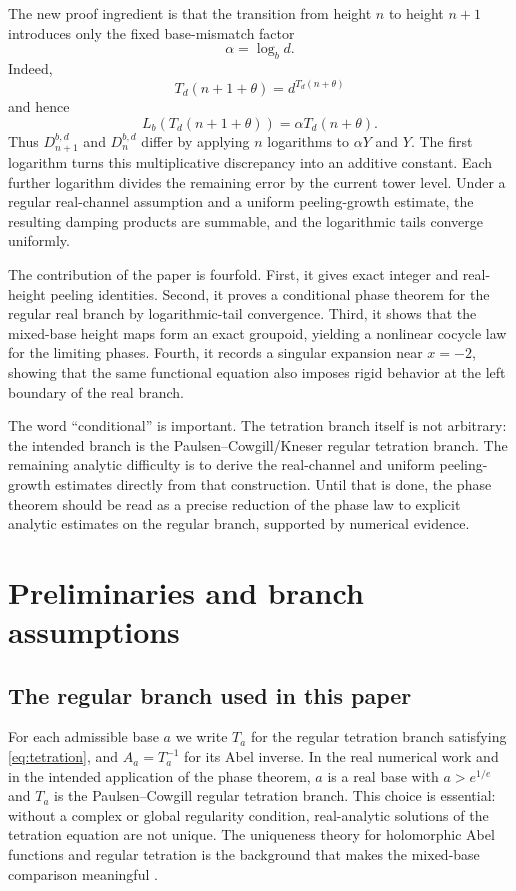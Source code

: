 \documentclass[11pt,a4paper]{article}
\theoremstyle{plain}
\theoremstyle{definition}
\theoremstyle{remark}
\begin{document}
The new proof ingredient is that the transition from height $n$ to height $n+1$ introduces only the fixed base-mismatch factor
\begin{equation}\label{eq:alpha-intro}
  \alpha=\log_b d.
\end{equation}
Indeed,
\[
  T_d(n+1+\theta)=d^{T_d(n+\theta)}
\]
and hence
\[
  L_b(T_d(n+1+\theta))=\alpha T_d(n+\theta).
\]
Thus $D_{n+1}^{b,d}$ and $D_n^{b,d}$ differ by applying $n$ logarithms to $\alpha Y$ and $Y$.  The first logarithm turns this multiplicative discrepancy into an additive constant.  Each further logarithm divides the remaining error by the current tower level.  Under a regular real-channel assumption and a uniform peeling-growth estimate, the resulting damping products are summable, and the logarithmic tails converge uniformly.

The contribution of the paper is fourfold.  First, it gives exact integer and real-height peeling identities.  Second, it proves a conditional phase theorem for the regular real branch by logarithmic-tail convergence.  Third, it shows that the mixed-base height maps form an exact groupoid, yielding a nonlinear cocycle law for the limiting phases.  Fourth, it records a singular expansion near $x=-2$, showing that the same functional equation also imposes rigid behavior at the left boundary of the real branch.

The word ``conditional'' is important.  The tetration branch itself is not arbitrary: the intended branch is the Paulsen--Cowgill/Kneser regular tetration branch.  The remaining analytic difficulty is to derive the real-channel and uniform peeling-growth estimates directly from that construction.  Until that is done, the phase theorem should be read as a precise reduction of the phase law to explicit analytic estimates on the regular branch, supported by numerical evidence.

\section{Preliminaries and branch assumptions}


\subsection{The regular branch used in this paper}

For each admissible base $a$ we write $T_a$ for the regular tetration branch satisfying \eqref{eq:tetration}, and $A_a=T_a^{-1}$ for its Abel inverse.  In the real numerical work and in the intended application of the phase theorem, $a$ is a real base with $a>e^{1/e}$ and $T_a$ is the Paulsen--Cowgill regular tetration branch.  This choice is essential: without a complex or global regularity condition, real-analytic solutions of the tetration equation are not unique.  The uniqueness theory for holomorphic Abel functions and regular tetration is the background that makes the mixed-base comparison meaningful \cite{paulsen-cowgill,trappmann-kouznetsov}.
\end{document}
